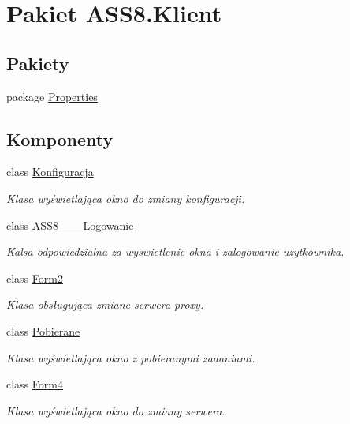 \hypertarget{a00060}{
\section{Pakiet ASS8.Klient}
\label{d9/d73/a00060}
}
\subsection*{Pakiety}
\begin{CompactItemize}
\item 
package \hyperlink{a00061}{Properties}
\end{CompactItemize}
\subsection*{Komponenty}
\begin{CompactItemize}
\item 
class \hyperlink{a00014}{Konfiguracja}
\begin{CompactList}\small\item\em Klasa wyświetlająca okno do zmiany konfiguracji. \item\end{CompactList}\item 
class \hyperlink{a00001}{ASS8\_\-\_\-\_\-Logowanie}
\begin{CompactList}\small\item\em Kalsa odpowiedzialna za wyswietlenie okna i zalogowanie uzytkownika. \item\end{CompactList}\item 
class \hyperlink{a00004}{Form2}
\begin{CompactList}\small\item\em Klasa obsługująca zmiane serwera proxy. \item\end{CompactList}\item 
class \hyperlink{a00019}{Pobierane}
\begin{CompactList}\small\item\em Klasa wyświetlająca okno z pobieranymi zadaniami. \item\end{CompactList}\item 
class \hyperlink{a00005}{Form4}
\begin{CompactList}\small\item\em Klasa wyświetlająca okno do zmiany serwera. \item\end{CompactList}\item 

\end{CompactItemize}
